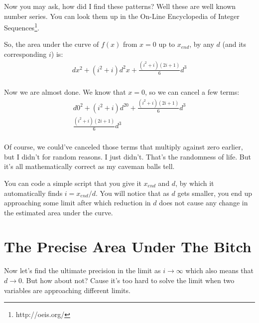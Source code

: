 \documentclass{report}
\begin{document}
Now you may ask, how did I find these patterns? Well these are well known
number series. You can look them up in the On-Line Encyclopedia of Integer
Sequences\footnote{http://oeis.org/}.

So, the area under the curve of $f(x)$ from $x = 0$ up to $x_{end}$, by any
$d$ (and its corresponding $i$) is:
\[\begin{split}
  dx^2  +  (i^2+i)d^2x   +  \frac{(i^2+i)(2i+1)}{6}d^3\\
\end{split}\]

Now we are almost done. We know that $x = 0$, so we can cancel a few terms:
\begin{equation}\label{eq:dick}\begin{split}
  d0^2  +  (i^2+i)d^20   +  \frac{(i^2+i)(2i+1)}{6}d^3\\
  \frac{(i^2+i)(2i+1)}{6}d^3\\
\end{split}\end{equation}

Of course, we could've canceled those terms that multiply against zero earlier,
but I didn't for random reasons. I just didn't. That's the randomness of life.
But it's all mathematically correct as my caveman balls tell.

You can code a simple script that you give it $x_{end}$ and $d$, by which it
automatically finds $i = x_{end}/d$. You will notice that as $d$ gets smaller,
you end up approaching some limit after which reduction in $d$ does not cause
any change in the estimated area under the curve.

\section{The Precise Area Under The Bitch}
Now let's find the ultimate precision in the limit as $i \rightarrow
\infty$ which also means that $d \rightarrow 0$. But how about not?
Cause it's too hard to solve the limit when two variables are
approaching different limits.
\end{document}
